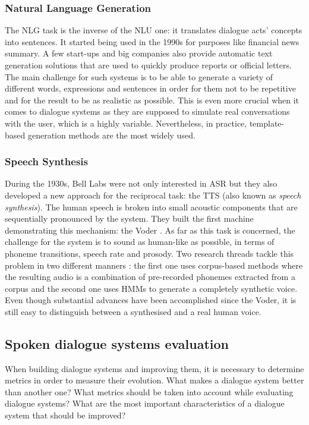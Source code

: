 		\subsubsection{Natural Language Generation}
		
			The NLG task is the inverse of the NLU one: it translates dialogue acts' concepts into sentences. It started being used in the 1990s for purposes like financial news summary. A few start-ups and big companies also provide automatic text generation solutions that are used to quickly produce reports or official letters. The main challenge for such systems is to be able to generate a variety of different words, expressions and sentences in order for them not to be repetitive and for the result to be as realistic as possible. This is even more crucial when it comes to dialogue systems as they are supposed to simulate real conversations with the user, which is a highly variable. Nevertheless, in practice, template-based generation methods are the most widely used.
			
		\subsubsection{Speech Synthesis}

			During the 1930s, Bell Labs were not only interested in ASR but they also developed a new approach for the reciprocal task: the TTS (also known as \textit{speech synthesis}). The human speech is broken into small acoustic components that are sequentially pronounced by the system. They built the first machine demonstrating this mechanism: the Voder \cite{Dudley1939}. As far as this task is concerned, the challenge for the system is to sound as human-like as possible, in terms of phoneme transitions, speech rate and prosody. Two research threads tackle this problem in two different manners \cite{Tabet2011}: the first one uses corpus-based methods where the resulting audio is a combination of pre-recorded phonemes extracted from a corpus and the second one uses HMMs to generate a completely synthetic voice. Even though substantial advances have been accomplished since the Voder, it is still easy to distinguish between a synthesised and a real human voice.

	\subsection{Spoken dialogue systems evaluation}

		When building dialogue systems and improving them, it is necessary to determine metrics in order to measure their evolution. What makes a dialogue system better than another one? What metrics should be taken into account while evaluating dialogue systems? What are the most important characteristics of a dialogue system that should be improved?
		
